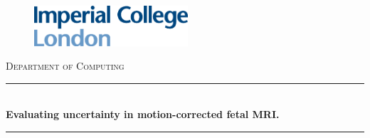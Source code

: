 
\begin{titlepage}

\newcommand{\HRule}{\rule{\linewidth}{0.3mm}} %


\begin{figure}
  \begin{flushleft}%
	\includegraphics[height=1.5cm]{images/logo.eps}\\[2cm] %
  \end{flushleft}
\end{figure}

\center %
 

\textsc{\Large Department of Computing}\\[1.0cm] %


\HRule \\[0.4cm]
{ \LARGE \bfseries Evaluating uncertainty in motion-corrected fetal MRI.}\\[0cm] %
\HRule \\[1.5cm]
 

\end{titlepage}
